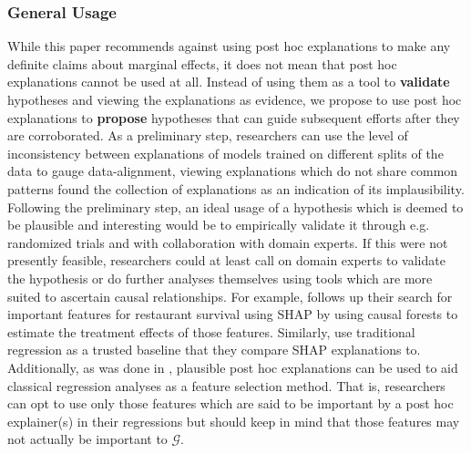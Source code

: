 \documentclass[mnsc,blindrev]{informs3}
\begin{document}
    \subsubsection{General Usage}
      While this paper recommends against using post hoc explanations to make any definite claims about marginal effects, it does not mean that post hoc explanations cannot be used at all. Instead of using them as a tool to \textbf{validate} hypotheses and viewing the explanations as evidence, we propose to use post hoc explanations to \textbf{propose} hypotheses that can guide subsequent efforts after they are corroborated.  As a preliminary step, researchers can use the level of inconsistency between explanations of models trained on different splits of the data to gauge data-alignment, viewing explanations which do not share common patterns found the collection of explanations as an indication of its implausibility. Following the preliminary step, an ideal usage of a hypothesis which is deemed to be plausible and interesting would be to empirically validate it through e.g. randomized trials and with collaboration with domain experts. If this were not presently feasible, researchers could at least call on domain experts to validate the hypothesis \citep{donnelly2023rashomon} or do further analyses themselves using tools which are more suited to ascertain causal relationships. For example,  \cite{zhang2023can} follows up their search for important features for restaurant survival using SHAP by using causal forests to estimate the treatment effects of those features. Similarly, \cite{hanauer22boosting} use traditional regression as a trusted baseline that they compare SHAP explanations to. 
      Additionally, as was done in \cite{tang2024china}, plausible post hoc explanations can be used to aid classical regression analyses as a feature selection method. That is, researchers can opt to use only those features which are said to be important by a post hoc explainer(s) in their regressions but should keep in mind that those features may not actually be important to $\mathcal{G}$. 
    
    
    
 
\end{document}
